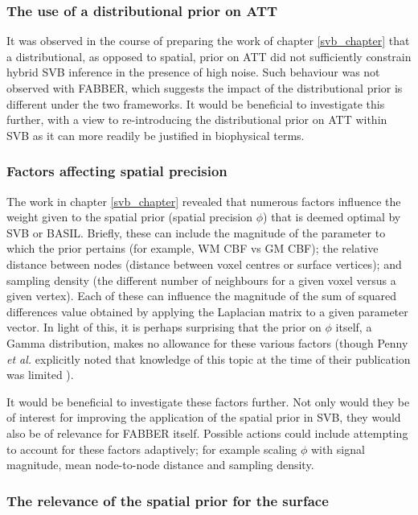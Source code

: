 \documentclass[12pt]{report}
\begin{document}
\subsubsection{The use of a distributional prior on ATT}

It was observed in the course of preparing the work of chapter \ref{svb_chapter} that a distributional, as opposed to spatial, prior on ATT did not sufficiently constrain hybrid SVB inference in the presence of high noise. Such behaviour was not observed with FABBER, which suggests the impact of the distributional prior is different under the two frameworks. It would be beneficial to investigate this further, with a view to re-introducing the distributional prior on ATT within SVB as it can more readily be justified in biophysical terms. 

\subsubsection{Factors affecting spatial precision} 

The work in chapter \ref{svb_chapter} revealed that numerous factors influence the weight given to the spatial prior (spatial precision $\phi$) that is deemed optimal by SVB or BASIL. Briefly, these can include the magnitude of the parameter to which the prior pertains (for example, WM CBF vs GM CBF); the relative distance between nodes (distance between voxel centres or surface vertices); and sampling density (the different number of neighbours for a given voxel versus a given vertex). Each of these can influence the magnitude of the sum of squared differences value obtained by applying the Laplacian matrix to a given parameter vector. In light of this, it is perhaps surprising that the prior on $\phi$ itself, a Gamma distribution, makes no allowance for these various factors (though Penny \textit{et al.} explicitly noted that knowledge of this topic at the time of their publication was limited \cite{Penny2005}). 

It would be beneficial to investigate these factors further. Not only would they be of interest for improving the application of the spatial prior in SVB, they would also be of relevance for FABBER itself. Possible actions could include attempting to account for these factors adaptively; for example scaling $\phi$ with signal magnitude, mean node-to-node distance and sampling density. 

\subsubsection{The relevance of the spatial prior for the surface}
\end{document}
